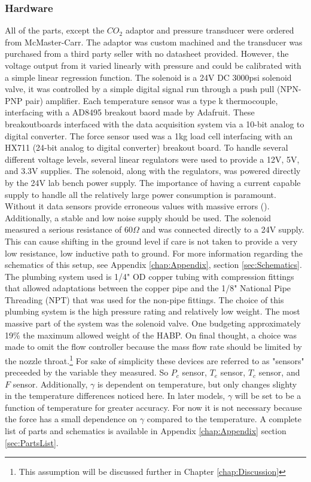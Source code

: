 \subsubsection{Hardware}
All of the parts, except the $CO_2$ adaptor and pressure transducer were ordered from McMaster-Carr. The adaptor was custom machined and the transducer was purchased from a third party seller with no datasheet provided. However, the voltage output from it varied linearly with pressure and could be calibrated with a simple linear regression function. The solenoid is a 24V DC 3000psi solenoid valve, it was controlled by a simple digital signal run through a push pull (NPN-PNP pair) amplifier. Each temperature sensor was a type k thermocouple, interfacing with a AD8495 breakout baord made by Adafruit. These breakoutboards interfaced with the data acquisition system via a 10-bit analog to digital converter. The force sensor used was a 1kg load cell interfacing with an HX711 (24-bit analog to digital converter) breakout board. To handle several different voltage levels, several linear regulators were used to provide a 12V, 5V, and 3.3V supplies. The solenoid, along with the regulators, was powered directly by the 24V lab bench power supply. The importance of having a current capable supply to handle all the relatively large power consumption is paramount. Without it data sensors provide erroneous values with massive errors (\cite{voltage}). Additionally, a stable and low noise supply should be used. The solenoid measured a serious resistance of $60\Omega$ and was connected directly to a 24V supply. This can cause shifting in the ground level if care is not taken to provide a very low resistance, low inductive path to ground. For more information regarding the schematics of this setup, see Appendix \ref{chap:Appendix}, section \ref{sec:Schematics}. The plumbing system used is 1/4" OD copper tubing with compression fittings that allowed adaptations between the copper pipe and the 1/8" National Pipe Threading (NPT) that was used for the non-pipe fittings. The choice of this plumbing system is the high pressure rating and relatively low weight. The most massive part of the system was the solenoid valve. One budgeting approximately 19\% the maximum allowed weight of the HABP. On final thought, a choice was made to omit the flow controller because the mass flow rate should be limited by the nozzle throat.\footnote{This assumption will be discussed further in Chapter \ref{chap:Discussion}} For sake of simplicity these devices are referred to as "sensors" preceeded by the variable they measured. So $P_c$ sensor, $T_e$ sensor, $T_c$ sensor, and $F$ sensor. Additionally, $\gamma$ is dependent on temperature, but only changes slighty in the temperature differences noticed here. In later models, $\gamma$ will be set to be a function of temperature for greater accuracy. For now it is not necessary because the force has a small dependence on $\gamma$ compared to the temperature. A complete list of parts and schematics is available in Appendix \ref{chap:Appendix} section \ref{sec:PartsList}.
